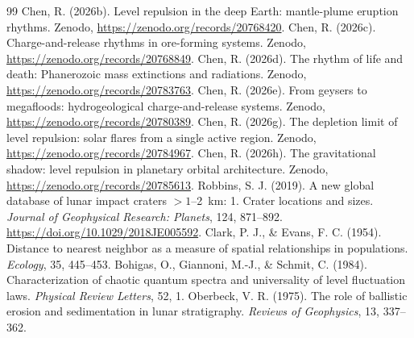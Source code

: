 \documentclass[12pt,a4paper]{article}
\begin{document}
\begin{thebibliography}{99}
\small
{} Chen, R. (2026b). Level repulsion in the deep Earth: mantle-plume eruption rhythms. Zenodo, \url{https://zenodo.org/records/20768420}.
 Chen, R. (2026c). Charge-and-release rhythms in ore-forming systems. Zenodo, \url{https://zenodo.org/records/20768849}.
 Chen, R. (2026d). The rhythm of life and death: Phanerozoic mass extinctions and radiations. Zenodo, \url{https://zenodo.org/records/20783763}.
 Chen, R. (2026e). From geysers to megafloods: hydrogeological charge-and-release systems. Zenodo, \url{https://zenodo.org/records/20780389}.
 Chen, R. (2026g). The depletion limit of level repulsion: solar flares from a single active region. Zenodo, \url{https://zenodo.org/records/20784967}.
 Chen, R. (2026h). The gravitational shadow: level repulsion in planetary orbital architecture. Zenodo, \url{https://zenodo.org/records/20785613}.
 Robbins, S. J. (2019). A new global database of lunar impact craters $>1$--2~km: 1. Crater locations and sizes. \emph{Journal of Geophysical Research: Planets}, 124, 871--892. \url{https://doi.org/10.1029/2018JE005592}.
 Clark, P. J., \& Evans, F. C. (1954). Distance to nearest neighbor as a measure of spatial relationships in populations. \emph{Ecology}, 35, 445--453.
 Bohigas, O., Giannoni, M.-J., \& Schmit, C. (1984). Characterization of chaotic quantum spectra and universality of level fluctuation laws. \emph{Physical Review Letters}, 52, 1.
 Oberbeck, V. R. (1975). The role of ballistic erosion and sedimentation in lunar stratigraphy. \emph{Reviews of Geophysics}, 13, 337--362.
\end{thebibliography}
\end{document}
